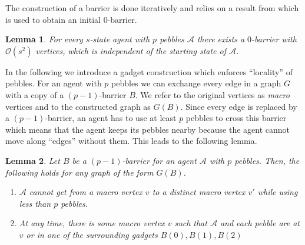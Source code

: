 \documentclass[oneside]{scrartcl}
\newtheorem{lem}{Lemma}
\begin{document}
The construction of a barrier is done iteratively and relies on a result from
\citeauthor{0barrier} \cite{0barrier} which is used to obtain an initial
$0$-barrier.
\begin{lem}
  \label{lem:0bar}
  For every $s$-state agent with $p$ pebbles $\mathcal{A}$ there exists a
  $0$-barrier with $\mathcal{O}(s^{2})$ vertices, which is independent of
  the starting state of $\mathcal{A}$.
\end{lem}

In the following we introduce a gadget construction which enforces
\enquote{locality} of pebbles. For an agent with $p$ pebbles we can exchange
every edge in a graph $G$ with a copy of a $(p-1)$-barrier $B$. We refer to the
original vertices as \emph{macro} vertices and to the constructed graph as
$G(B)$.  Since every edge is replaced by a $(p-1)$-barrier, an agent has to use
at least $p$ pebbles to cross this barrier which means that the agent keeps its
pebbles nearby because the agent cannot move along \enquote{edges} without
them. This leads to the following lemma.
\begin{lem}
  \label{lem:loc}
  Let $B$ be a $(p-1)$-barrier for an agent $\mathcal{A}$ with $p$ pebbles.
  Then, the following holds for any graph of the form $G(B)$.
  \begin{enumerate}
    \item $\mathcal{A}$ cannot get from a macro vertex $v$ to a distinct
      macro vertex $v'$ while using less than $p$ pebbles.
    \item At any time, there is some macro vertex $v$ such that $\mathcal{A}$
      and each pebble are at $v$ or in one of the surrounding gadgets $B(0),
      B(1), B(2)$
  \end{enumerate}
\end{lem}
\end{document}

